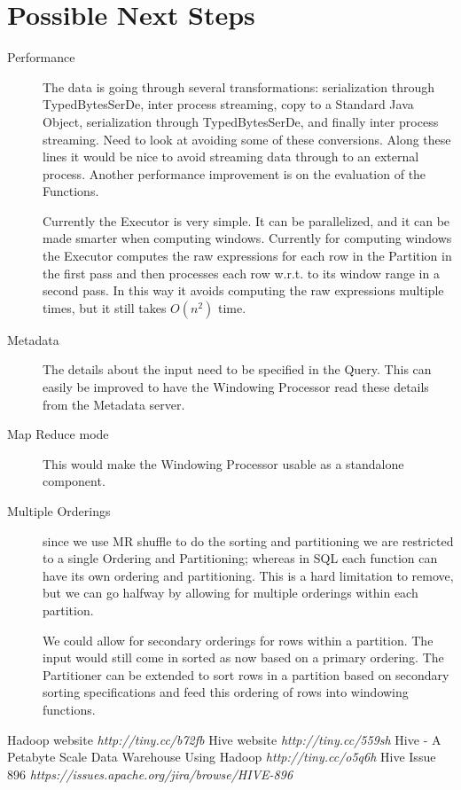 \documentclass[pdftex,10pt,a4paper]{article}
\begin{document}
\section{Possible Next Steps}
\begin{description}
\item[Performance]  The data is going through several transformations: serialization through TypedBytesSerDe, inter process streaming, copy to a Standard Java Object, serialization through TypedBytesSerDe, and finally inter process streaming. Need to look at avoiding some of these conversions. Along these lines it would be nice to avoid streaming data through to an external process. Another performance improvement is on the evaluation of the Functions. 

Currently the Executor is very simple. It can be parallelized, and it can be made smarter when computing windows. Currently for computing windows the Executor computes the raw expressions for each row in the Partition in the first pass and then processes each row w.r.t. to its window range in a second pass. In this way it avoids computing the raw expressions multiple times, but it still takes $O(n^2)$  time.
\item[Metadata] The details about the input need to be specified in the Query. This can easily be improved to have the Windowing Processor read these details from the Metadata server.
\item[Map Reduce mode]  This would make the Windowing Processor usable as a standalone component.
\item[Multiple Orderings] since we use MR shuffle to do the sorting and partitioning we are restricted to a single Ordering and Partitioning; whereas in SQL each function can have its own ordering and partitioning.  This is a hard limitation to remove, but we can go halfway by allowing for multiple orderings within each partition. 

We could allow for secondary orderings for rows within a partition. The input would still come in sorted as now based on a primary ordering. The Partitioner can be extended to sort rows in a partition based on secondary sorting specifications and feed this ordering of rows into windowing functions.
\end{description}
  
  \begin{thebibliography}{Dillon 83}
    Hadoop website {\em http://tiny.cc/b72fb}
    Hive website {\em http://tiny.cc/559sh}
    Hive - A Petabyte Scale Data Warehouse Using Hadoop {\em http://tiny.cc/o5q6h}
    Hive Issue 896 {\em https://issues.apache.org/jira/browse/HIVE-896}
  \end{thebibliography}
\end{document}
